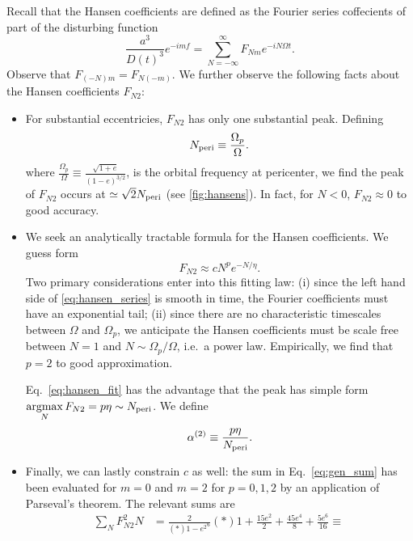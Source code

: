 \documentclass[
        fleqn,
        usenatbib,
        referee,
    ]{mnras}
\newcommand*{\p}[1]{\left(#1\right)}
\DeclareMathOperator*{\argmax}{argmax}
\begin{document}
Recall that the Hansen coefficients are defined as the Fourier series coffecients
of part of the disturbing function
\begin{equation}
    \frac{a^3}{D(t)^3} e^{-imf} = \sum\limits_{N = -\infty}^\infty
        F_{Nm} e^{-iN\Omega t}.\label{eq:hansen_series}
\end{equation}
Observe that $F_{(-N)m} = F_{N(-m)}$. We further observe the following facts about
the Hansen coefficients $F_{N2}$:
\begin{itemize}
    \item For substantial eccentricies, $F_{N2}$ has only one substantial peak.
        Defining
        \begin{equation}
            N_{\rm peri} \equiv \frac{\Omega_p}{\Omega}.
        \end{equation}
        where $\frac{\Omega_p}{\Omega} \equiv \frac{\sqrt{1 + e}}{\p{1 -
        e}^{3/2}}$, is the orbital frequency at pericenter, we find the peak of
        $F_{N2}$ occurs at $\simeq \sqrt{2}N_{\rm peri}$ (see
        \autoref{fig:hansens}). In fact, for $N < 0$, $F_{N2} \approx 0$ to good
        accuracy.

    \item We seek an analytically tractable formula for the Hansen coefficients.
        We guess form
        \begin{equation}
            F_{N2} \approx cN^{p}e^{-N/\eta}.\label{eq:hansen_fit}
        \end{equation}
        Two primary considerations enter into this fitting law: (i) since the
        left hand side of \autoref{eq:hansen_series} is smooth in time, the
        Fourier coefficients must have an exponential tail; (ii) since there are
        no characteristic timescales between $\Omega$ and $\Omega_p$, we
        anticipate the Hansen coefficients must be scale free between $N = 1$
        and $N \sim \Omega_p / \Omega$, i.e.\ a power law. Empirically, we find
        that $p = 2$ to good approximation.

        Eq.~\eqref{eq:hansen_fit} has the advantage that the peak has simple
        form $\argmax\limits_N F_{N2} = p\eta \sim N_{\rm peri}$. We define
        \begin{equation}
            \alpha^{(2)} \equiv \frac{p\eta}{N_{\rm peri}}.\label{eq:alpha2_def}
        \end{equation}

    \item Finally, we can lastly constrain $c$ as well: the sum in
        Eq.~\eqref{eq:gen_sum} has been evaluated for $m = 0$ and $m = 2$ for
        $p = 0, 1, 2$ \citep{hut,sl,vlf} by an application of Parseval's
        theorem. The relevant sums are
        \begin{align}
            \sum\limits_N F_{N2}^2N
                &= \frac{2}{\p*{1 - e^2}^6}\p*{1 + \frac{15e^2}{2}
                    + \frac{45 e^4}{8} + \frac{5e^6}{16}}
                \equiv \frac{}{}
        \end{align}
\end{itemize}
\end{document}
